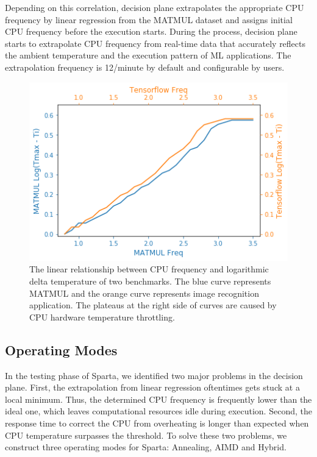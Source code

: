  Depending on this correlation, decision plane extrapolates the appropriate CPU frequency by linear regression from the MATMUL dataset and assigns initial CPU frequency before the execution starts. During the process, decision plane starts to extrapolate CPU frequency from real-time data that accurately reflects the ambient temperature and the execution pattern of ML applications. The extrapolation frequency is 12/minute by default and configurable by users.

\begin{figure}[ht]
\centering
\includegraphics[scale=0.5]{figures/matmul-tensorflow.png}
\caption{The linear relationship between CPU frequency and logarithmic delta temperature of two benchmarks. The blue curve represents MATMUL and the orange curve represents image recognition application. The plateaus at the right side of curves are caused by CPU hardware temperature throttling. } \label{fig:mat-vs-tf}
\end{figure}


\subsection{Operating Modes}

In the testing phase of Sparta, we identified two major problems in the decision plane. First, the extrapolation from linear regression oftentimes gets stuck at a local minimum. Thus, the determined CPU frequency is frequently lower than the ideal one, which leaves computational resources idle during execution. Second, the response time to correct the CPU from overheating is longer than expected when CPU temperature surpasses the threshold. To solve these two problems, we construct three operating modes for Sparta: Annealing, AIMD and Hybrid. 

